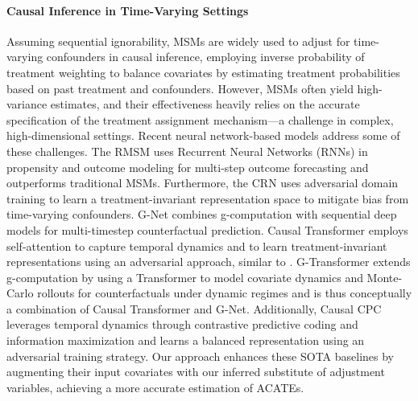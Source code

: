 \documentclass[10pt]{article} %
\begin{document}
\paragraph{Causal Inference in Time-Varying Settings} Assuming sequential ignorability, MSMs \citep{robins2000MSM} are widely used to adjust for time-varying confounders in causal inference, employing inverse probability of treatment weighting \citep{robins-time-varying-exposures} to balance covariates by estimating treatment probabilities based on past treatment and confounders. However, MSMs often yield high-variance estimates, and their effectiveness heavily relies on the accurate specification of the treatment assignment mechanism—a challenge in complex, high-dimensional settings. Recent neural network-based models address some of these challenges. The RMSM \citep{lim2018RMSM} uses Recurrent Neural Networks (RNNs) in propensity and outcome modeling for multi-step outcome forecasting and outperforms traditional MSMs. Furthermore, the CRN \citep{bica2020estimatingCRN} uses adversarial domain training to learn a treatment-invariant representation space to mitigate bias from time-varying confounders. G-Net \citep{Li2021GNetAR} combines g-computation \citep{vansteelandt2014structural} with sequential deep models for multi-timestep counterfactual prediction. Causal Transformer \citep{Melnychuk2022CausalTF} employs self-attention to capture temporal dynamics and to learn treatment-invariant representations using an adversarial approach, similar to \cite{bica2020estimatingCRN}. G-Transformer \citep{xiong2024g} extends g-computation by using a Transformer to model covariate dynamics and Monte-Carlo rollouts for counterfactuals under dynamic regimes and is thus conceptually a combination of Causal Transformer and G-Net. Additionally, Causal CPC \citep{bouchattaoui2024CausalCPC} leverages temporal dynamics through contrastive predictive coding and information maximization and learns a balanced representation using an adversarial training strategy. Our approach enhances these SOTA baselines by augmenting their input covariates with our inferred substitute of adjustment variables, achieving a more accurate estimation of ACATEs.
\end{document}
